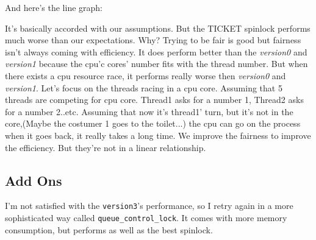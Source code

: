 \documentclass{article}
\begin{document}
\begin{itemize}
		And here's the line graph: \\
		\begin{center}
		\end{center}
		It's basically accorded with our assumptions. But the TICKET spinlock performs much worse than our expectations. Why? Trying to be fair is good but fairness isn't always coming with efficiency. It does perform better than the \emph{version0} and \emph{version1} because the cpu'c cores' number fits with the thread  number. But when there exists a cpu resource race, it performs really worse then \emph{version0} and \emph{version1}.  Let's focus on the threads racing in a cpu core. Assuming that 5 threads are competing for cpu core. Thread1 asks for a number 1, Thread2 asks for a number 2..etc. Assuming that now it's thread1' turn, but it's not in the core,(Maybe the costumer 1 goes to the toilet...) the cpu can go on the process when it goes back, it really takes a long time. We improve the fairness to improve the efficiency. But they're not in a linear relationship. 
	\end{itemize}
	\subsection{Add Ons}
	 I'm not satisfied with the \texttt{version3}'s performance, so I retry again in a more sophisticated way called \texttt{queue\_control\_lock}. It comes with more memory consumption, but performs as well as the best spinlock. \\
\end{document}
